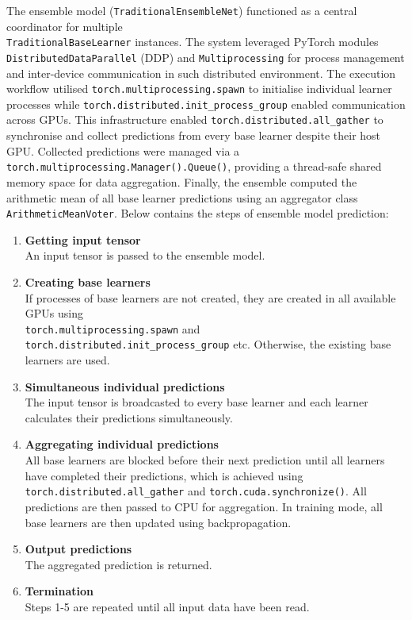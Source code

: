 The ensemble model (\texttt{TraditionalEnsembleNet}) functioned as a central coordinator for multiple 
\\
\texttt{TraditionalBaseLearner} instances. The system leveraged PyTorch modules \texttt{DistributedDataParallel} (DDP) and \texttt{Multiprocessing} for process management and inter-device communication in such distributed environment. The execution workflow utilised \texttt{torch.multiprocessing.spawn} to initialise individual learner processes while \texttt{torch.distributed.init\_process\_group} enabled communication across GPUs. This infrastructure enabled \texttt{torch.distributed.all\_gather} to synchronise and collect predictions from every base learner despite their host GPU. Collected predictions were managed via a 
\\
\texttt{torch.multiprocessing.Manager().Queue()}, providing a thread-safe shared memory space for data aggregation. Finally, the ensemble computed the arithmetic mean of all base learner predictions using an aggregator class \texttt{ArithmeticMeanVoter}. Below contains the steps of ensemble model prediction: 
\begin{enumerate}
    \item \textbf{Getting input tensor} \\
    An input tensor is passed to the ensemble model. 

    \item \textbf{Creating base learners} \\
    If processes of base learners are not created, they are created in all available GPUs using 
    \\
    \texttt{torch.multiprocessing.spawn} and \texttt{torch.distributed.init\_process\_group} etc. Otherwise, the existing base learners are used. 

    \item \textbf{Simultaneous individual predictions} \\
    The input tensor is broadcasted to every base learner and each learner calculates their predictions simultaneously. 

    \item \textbf{Aggregating individual predictions} \\
    All base learners are blocked before their next prediction until all learners have completed their predictions, which is achieved using \texttt{torch.distributed.all\_gather} and \texttt{torch.cuda.synchronize()}. All predictions are then passed to CPU for aggregation. In training mode, all base learners are then updated using backpropagation. 

    \item \textbf{Output predictions} \\
    The aggregated prediction is returned. 

    \item \textbf{Termination} \\
    Steps 1-5 are repeated until all input data have been read. 
\end{enumerate}


